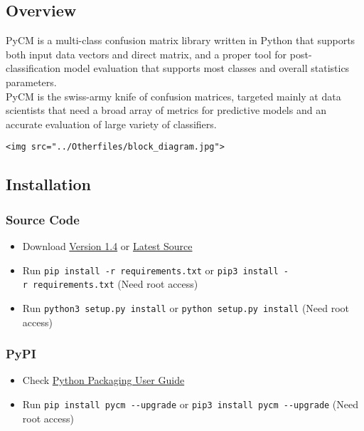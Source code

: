 \documentclass[11pt]{article}
\providecommand{\tightlist}{%
      \setlength{\itemsep}{0pt}\setlength{\parskip}{0pt}}
\begin{document}
    \hypertarget{overview}{%
\subsection{Overview}\label{overview}}

    PyCM is a multi-class confusion matrix library written in Python that
supports both input data vectors and direct matrix, and a proper tool
for post-classification model evaluation that supports most classes and
overall statistics parameters.\\
PyCM is the swiss-army knife of confusion matrices, targeted mainly at
data scientists that need a broad array of metrics for predictive models
and an accurate evaluation of large variety of classifiers.

    \begin{verbatim}
<img src="../Otherfiles/block_diagram.jpg">
\end{verbatim}

    \hypertarget{installation}{%
\subsection{Installation}\label{installation}}

    \hypertarget{source-code}{%
\subsubsection{Source Code}\label{source-code}}

\begin{itemize}
\tightlist
\item
  Download
  \href{https://github.com/sepandhaghighi/pycm/archive/v1.4.zip}{Version
  1.4} or
  \href{https://github.com/sepandhaghighi/pycm/archive/dev.zip}{Latest
  Source}
\item
  Run \texttt{pip\ install\ -r\ requirements.txt} or
  \texttt{pip3\ install\ -r\ requirements.txt} (Need root access)
\item
  Run \texttt{python3\ setup.py\ install} or
  \texttt{python\ setup.py\ install} (Need root access)
\end{itemize}

    \hypertarget{pypi}{%
\subsubsection{PyPI}\label{pypi}}

\begin{itemize}
\tightlist
\item
  Check \href{https://packaging.python.org/installing/}{Python Packaging
  User Guide}\\
\item
  Run \texttt{pip\ install\ pycm\ -\/-upgrade} or
  \texttt{pip3\ install\ pycm\ -\/-upgrade} (Need root access)
\end{itemize}
\end{document}
